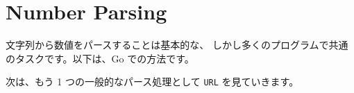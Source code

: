 \section{Number Parsing}

文字列から数値をパースすることは基本的な、 しかし多くのプログラムで共通のタスクです。以下は、Go での方法です。




次は、もう 1 つの一般的なパース処理として \texttt{URL} を見ていきます。